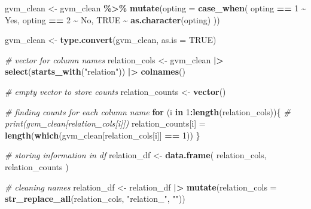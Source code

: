 \documentclass[
]{article}
\newenvironment{Shaded}{\begin{snugshade}}{\end{snugshade}}
\newcommand{\AttributeTok}[1]{\textcolor[rgb]{0.13,0.29,0.53}{#1}}
\newcommand{\CommentTok}[1]{\textcolor[rgb]{0.56,0.35,0.01}{\textit{#1}}}
\newcommand{\ConstantTok}[1]{\textcolor[rgb]{0.56,0.35,0.01}{#1}}
\newcommand{\ControlFlowTok}[1]{\textcolor[rgb]{0.13,0.29,0.53}{\textbf{#1}}}
\newcommand{\DecValTok}[1]{\textcolor[rgb]{0.00,0.00,0.81}{#1}}
\newcommand{\FunctionTok}[1]{\textcolor[rgb]{0.13,0.29,0.53}{\textbf{#1}}}
\newcommand{\NormalTok}[1]{#1}
\newcommand{\OtherTok}[1]{\textcolor[rgb]{0.56,0.35,0.01}{#1}}
\newcommand{\SpecialCharTok}[1]{\textcolor[rgb]{0.81,0.36,0.00}{\textbf{#1}}}
\newcommand{\StringTok}[1]{\textcolor[rgb]{0.31,0.60,0.02}{#1}}
\begin{document}
\begin{Shaded}
\begin{Highlighting}[]
\NormalTok{gvm\_clean }\OtherTok{\textless{}{-}}\NormalTok{ gvm\_clean }\SpecialCharTok{\%\textgreater{}\%}
  \FunctionTok{mutate}\NormalTok{(}\AttributeTok{opting =} \FunctionTok{case\_when}\NormalTok{(}
\NormalTok{    opting }\SpecialCharTok{==} \StringTok{\textquotesingle{}1\textquotesingle{}} \SpecialCharTok{\textasciitilde{}} \StringTok{\textquotesingle{}Yes\textquotesingle{}}\NormalTok{,}
\NormalTok{    opting }\SpecialCharTok{==} \StringTok{\textquotesingle{}2\textquotesingle{}} \SpecialCharTok{\textasciitilde{}} \StringTok{\textquotesingle{}No\textquotesingle{}}\NormalTok{,}
    \ConstantTok{TRUE} \SpecialCharTok{\textasciitilde{}} \FunctionTok{as.character}\NormalTok{(opting)}
\NormalTok{  ))}
                                 
\NormalTok{gvm\_clean }\OtherTok{\textless{}{-}} \FunctionTok{type.convert}\NormalTok{(gvm\_clean, }\AttributeTok{as.is =} \ConstantTok{TRUE}\NormalTok{)}
\end{Highlighting}
\end{Shaded}

\begin{Shaded}
\begin{Highlighting}[]
\CommentTok{\# vector for column names}
\NormalTok{relation\_cols }\OtherTok{\textless{}{-}}\NormalTok{ gvm\_clean }\SpecialCharTok{|\textgreater{}} \FunctionTok{select}\NormalTok{(}\FunctionTok{starts\_with}\NormalTok{(}\StringTok{"relation"}\NormalTok{)) }\SpecialCharTok{|\textgreater{}} \FunctionTok{colnames}\NormalTok{()}

\CommentTok{\# empty vector to store counts}
\NormalTok{relation\_counts }\OtherTok{\textless{}{-}} \FunctionTok{vector}\NormalTok{()}

\CommentTok{\# finding counts for each column name}
\ControlFlowTok{for}\NormalTok{ (i }\ControlFlowTok{in} \DecValTok{1}\SpecialCharTok{:}\FunctionTok{length}\NormalTok{(relation\_cols))\{}
  \CommentTok{\# print(gvm\_clean[relation\_cols[i]])}
\NormalTok{  relation\_counts[i] }\OtherTok{=} \FunctionTok{length}\NormalTok{(}\FunctionTok{which}\NormalTok{(gvm\_clean[relation\_cols[i]] }\SpecialCharTok{==} \DecValTok{1}\NormalTok{))}
\NormalTok{\}}

\CommentTok{\# storing information in df}
\NormalTok{relation\_df }\OtherTok{\textless{}{-}} \FunctionTok{data.frame}\NormalTok{(}
\NormalTok{  relation\_cols,}
\NormalTok{  relation\_counts}
\NormalTok{)}

\CommentTok{\# cleaning names}
\NormalTok{relation\_df }\OtherTok{\textless{}{-}}\NormalTok{ relation\_df }\SpecialCharTok{|\textgreater{}} \FunctionTok{mutate}\NormalTok{(}\AttributeTok{relation\_cols =} \FunctionTok{str\_replace\_all}\NormalTok{(relation\_cols, }\StringTok{"relation\_"}\NormalTok{, }\StringTok{""}\NormalTok{))}
\end{Highlighting}
\end{Shaded}
\end{document}
